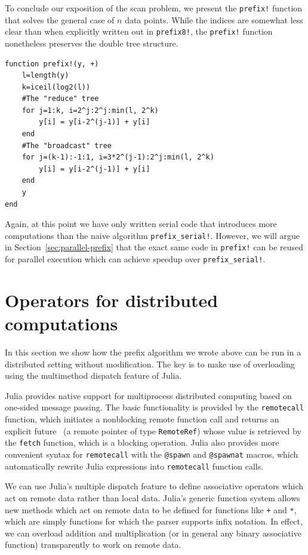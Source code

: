 \documentclass{sig-alternate}
\newcommand{\code}[1]{\texttt{#1}}
\begin{document}
To conclude our exposition of the scan problem, we present the \code{prefix!}
function that solves the general case of $n$ data points. While the indices are
somewhat less clear than when explicitly written out in \code{prefix8!}, the
\code{prefix!} function nonetheless preserves the double tree structure.

\begin{verbatim}
function prefix!(y, +)
    l=length(y)
    k=iceil(log2(l))
    #The "reduce" tree
    for j=1:k, i=2^j:2^j:min(l, 2^k)
        y[i] = y[i-2^(j-1)] + y[i]
    end
    #The "broadcast" tree
    for j=(k-1):-1:1, i=3*2^(j-1):2^j:min(l, 2^k)
        y[i] = y[i-2^(j-1)] + y[i]
    end
    y
end
\end{verbatim}

Again, at this point we have only written serial code that introduces more
computations than the naive algorithm \code{prefix\allowbreak\_serial!}.
However, we will argue in Section~\ref{sec:parallel-prefix} that the exact same
code in \code{prefix!} can be reused for parallel execution which can achieve
speedup over \code{prefix\allowbreak\_serial!}.

\section{Operators for distributed computations}

In this section we show how the prefix algorithm we wrote above can be run in a
distributed setting without modification. The key is to make use of overloading
using the multimethod dispatch feature of Julia.

Julia provides native support for multiprocess distributed computing based on
one-sided message passing. The basic functionality is provided by the
\code{remotecall} function, which initiates a nonblocking remote function call
and returns an explicit future~\cite{Friedman1976} (a remote pointer of type
\code{RemoteRef}) whose value is retrieved by the \code{fetch} function, which
is a blocking operation. Julia also provides more convenient syntax for
\code{remotecall} with the \code{@spawn} and \code{@spawnat} macros, which
automatically rewrite Julia expressions into \code{remotecall} function calls.

We can use Julia's multiple dispatch feature to define associative operators
which act on remote data rather than local data. Julia's generic function
system allows new methods which act on remote data to be defined for functions
like \code{+} and \code{*}, which are simply functions for which the parser
supports infix notation. In effect, we can overload addition and multiplication
(or in general any binary associative function) transparently to work on remote
data.
\end{document}
